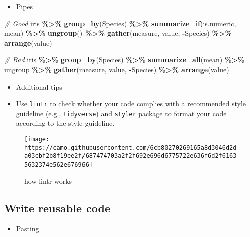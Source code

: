 \documentclass[
]{book}
\newenvironment{Shaded}{\begin{snugshade}}{\end{snugshade}}
\newcommand{\CommentTok}[1]{\textcolor[rgb]{0.56,0.35,0.01}{\textit{#1}}}
\newcommand{\KeywordTok}[1]{\textcolor[rgb]{0.13,0.29,0.53}{\textbf{#1}}}
\newcommand{\NormalTok}[1]{#1}
\newcommand{\OperatorTok}[1]{\textcolor[rgb]{0.81,0.36,0.00}{\textbf{#1}}}
\newcommand{\StringTok}[1]{\textcolor[rgb]{0.31,0.60,0.02}{#1}}
\providecommand{\tightlist}{%
  \setlength{\itemsep}{0pt}\setlength{\parskip}{0pt}}
\begin{document}
\begin{itemize}
\tightlist
\item
  Pipes
\end{itemize}

\begin{Shaded}
\begin{Highlighting}[]
\CommentTok{\# Good}
\NormalTok{iris }\OperatorTok{\%>\%}
\StringTok{  }\KeywordTok{group\_by}\NormalTok{(Species) }\OperatorTok{\%>\%}
\StringTok{  }\KeywordTok{summarize\_if}\NormalTok{(is.numeric, mean) }\OperatorTok{\%>\%}
\StringTok{  }\KeywordTok{ungroup}\NormalTok{() }\OperatorTok{\%>\%}
\StringTok{  }\KeywordTok{gather}\NormalTok{(measure, value, }\OperatorTok{{-}}\NormalTok{Species) }\OperatorTok{\%>\%}
\StringTok{  }\KeywordTok{arrange}\NormalTok{(value)}

\CommentTok{\# Bad}
\NormalTok{iris }\OperatorTok{\%>\%}\StringTok{ }\KeywordTok{group\_by}\NormalTok{(Species) }\OperatorTok{\%>\%}\StringTok{ }\KeywordTok{summarize\_all}\NormalTok{(mean) }\OperatorTok{\%>\%}
\NormalTok{ungroup }\OperatorTok{\%>\%}\StringTok{ }\KeywordTok{gather}\NormalTok{(measure, value, }\OperatorTok{{-}}\NormalTok{Species) }\OperatorTok{\%>\%}
\KeywordTok{arrange}\NormalTok{(value)}
\end{Highlighting}
\end{Shaded}

\begin{itemize}
\item
  Additional tips
\item
  Use \texttt{lintr} to check whether your code complies with a recommended style guideline (e.g., \texttt{tidyverse}) and \texttt{styler} package to format your code according to the style guideline.
\end{itemize}

\begin{figure}
\centering
\texttt{[image: https://camo.githubusercontent.com/6cb80270269165a8d3046d2da03cbf2b8f19ee2f/687474703a2f2f692e696d6775722e636f6d2f61635632374e562e676966]}
\caption{how lintr works}
\end{figure}

\hypertarget{write-reusable-code}{%
\subsection{Write reusable code}\label{write-reusable-code}}

\begin{itemize}
\tightlist
\item
  Pasting
\end{itemize}
\end{document}
